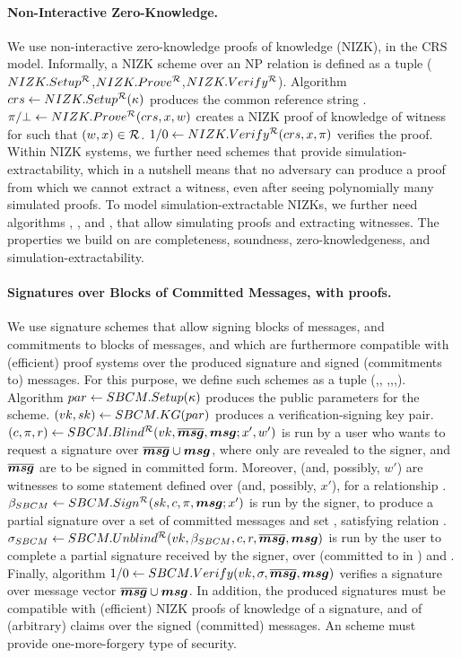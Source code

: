 \paragraph{Non-Interactive Zero-Knowledge.} %
We use non-interactive zero-knowledge proofs of knowledge (NIZK), in the CRS
model. Informally, a NIZK scheme over an NP relation \NIZKRel is defined as a
tuple ($NIZK.Setup^{\mathcal{R}}$,$NIZK.Prove^{\mathcal{R}}$,$NIZK.Verify^\mathcal{R}$).
Algorithm $crs \gets NIZK.Setup^{\mathcal{R}}(\kappa)$ produces the common
reference string \NIZKcrs. $\pi/\bot \gets NIZK.Prove^{\mathcal{R}}(crs,
x,w)$ creates a NIZK proof of knowledge of witness \NIZKw for \NIZKx
such that $(w,x) \in \mathcal{R}$. $1/0 \gets NIZK.Verify^{\mathcal{R}}
(crs,x,\pi)$ verifies the proof. Within NIZK systems, we
further need schemes that provide simulation-extractability, which in a nutshell
means that no adversary can produce a proof from which we cannot extract a
witness, even after seeing polynomially many simulated proofs. To model
simulation-extractable NIZKs, we further need algorithms \NIZKSimSetup,
\NIZKSim, and \NIZKExtract, that allow simulating proofs and extracting
witnesses. The properties we build on are completeness, soundness,
zero-knowledgeness, and simulation-extractability.

\paragraph{Signatures over Blocks of Committed Messages, with proofs.} %
We use signature schemes that allow signing blocks of messages, and commitments
to blocks of messages, and which are furthermore compatible with (efficient)
proof systems over the produced signature and signed (commitments to) messages.
For this purpose, we define such schemes as a tuple (\SBCMSetup,\SBCMKeyGen,
\SBCMBlind,\SBCMSign,\SBCMUnblind,\SBCMVerify).
%
Algorithm $par \gets SBCM.Setup(\kappa)$ produces the public parameters for
the scheme.
% 
$(vk,sk) \gets SBCM.KG(par)$ produces a verification-signing key pair.
%
$(c,\pi,r) \gets SBCM.Blind^{\mathcal{R}}(vk,\overline{\boldsymbol{msg}},\boldsymbol{msg};x',w')$ is run by a
user who wants to request a signature over $\overline{\boldsymbol{msg}} \cup \boldsymbol{msg}$, where only \smsg
are revealed to the signer, and $\overline{\boldsymbol{msg}}$ are to be signed in committed form.
Moreover, \osmsg (and, possibly, $w'$) are witnesses to some statement defined
over \smsg (and, possibly, $x'$), for a relationship \NIZKRel.
%
$\beta_{SBCM} \gets SBCM.Sign^{\mathcal{R}}(sk,c,\pi,\boldsymbol{msg}; x')$ is run by the
signer, to produce a partial signature \SBCMbsig over a set of committed
messages and set \smsg, satisfying relation \NIZKRel.
%
$\sigma_{SBCM} \gets SBCM.Unblind^{\mathcal{R}}(vk,\beta_{SBCM},c,r,\overline{\boldsymbol{msg}},\boldsymbol{msg})$ is
run by the user to complete a partial signature \SBCMbsig received by the
signer, over \osmsg (committed to in \Ccom) and \smsg.
%
Finally, algorithm $1/0 \gets SBCM.Verify(vk,\sigma,\overline{\boldsymbol{msg}},\boldsymbol{msg})$ verifies a
signature \sig over message vector $\overline{\boldsymbol{msg}} \cup \boldsymbol{msg}$.
%
In addition, the produced signatures must be compatible with (efficient) NIZK
proofs of knowledge of a signature, and of (arbitrary) claims over the signed
(committed) messages. An \SBCM scheme must provide one-more-forgery type of
security.

